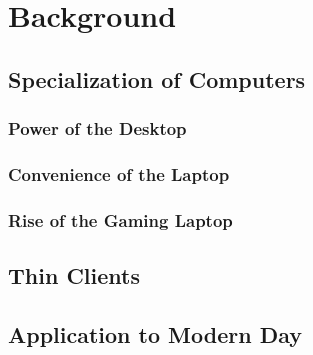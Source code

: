 \chapter{Background} %

\label{Chapter2} %


\section{Specialization of Computers}

\todosection


\subsection{Power of the Desktop}

\todosection


\subsection{Convenience of the Laptop}

\todosection


\subsection{Rise of the Gaming Laptop}

\todosection


\section{Thin Clients}

\todosection


\section{Application to Modern Day}

\todosection